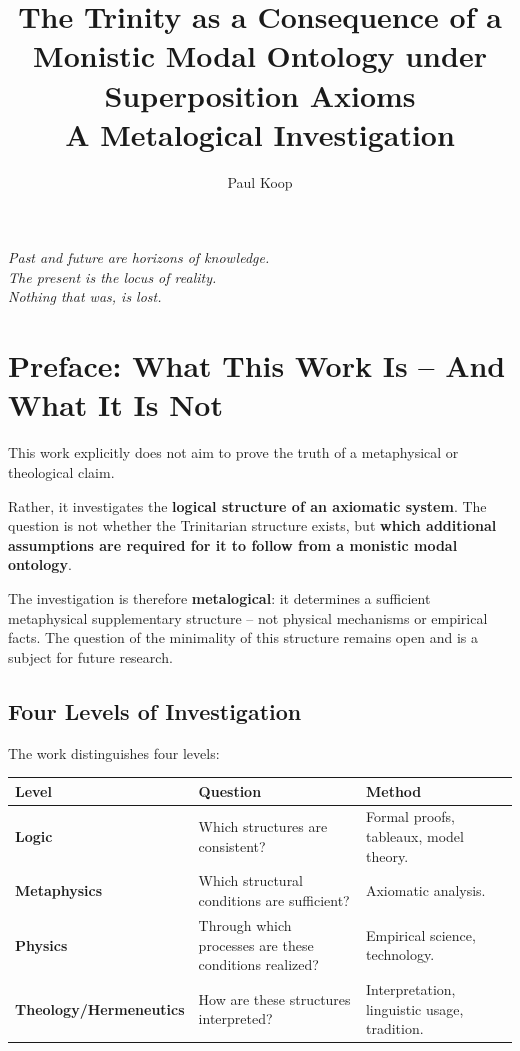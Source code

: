 \documentclass[
]{article}
\title{The Trinity as a Consequence of a Monistic Modal Ontology under Superposition Axioms \\ \large A Metalogical Investigation}
\author{Paul Koop}
\date{}
\begin{document}
\maketitle

\begin{center}
\emph{Past and future are horizons of knowledge. \\ The present is the locus of reality. \\ Nothing that was, is lost.}
\end{center}

\newpage
{
\setcounter{tocdepth}{3}
\tableofcontents
}
\newpage

\section{Preface: What This Work Is – And What It Is Not}

This work explicitly does not aim to prove the truth of a metaphysical or theological claim.

Rather, it investigates the \textbf{logical structure of an axiomatic system}. The question is not whether the Trinitarian structure exists, but \textbf{which additional assumptions are required for it to follow from a monistic modal ontology}.

The investigation is therefore \textbf{metalogical}: it determines a sufficient metaphysical supplementary structure – not physical mechanisms or empirical facts. The question of the minimality of this structure remains open and is a subject for future research.

\subsection{Four Levels of Investigation}

The work distinguishes four levels:

\begin{table}[h]
\centering
\begin{tabular}{lll}
\toprule
\textbf{Level} & \textbf{Question} & \textbf{Method} \\
\midrule
\textbf{Logic} & Which structures are consistent? & Formal proofs, tableaux, model theory. \\
\textbf{Metaphysics} & Which structural conditions are sufficient? & Axiomatic analysis. \\
\textbf{Physics} & Through which processes are these conditions realized? & Empirical science, technology. \\
\textbf{Theology/Hermeneutics} & How are these structures interpreted? & Interpretation, linguistic usage, tradition. \\
\bottomrule
\end{tabular}
\end{table}
\end{document}
